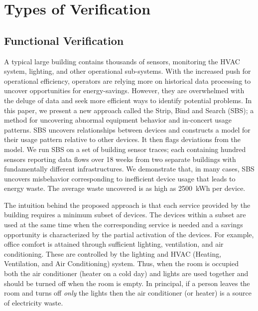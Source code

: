 \section{Types of Verification}


\subsection{Functional Verification}%
A typical large building contains thousands of sensors, monitoring the HVAC system, lighting, and other operational sub-systems.
With the increased push for operational efficiency, operators are relying more on historical data processing to uncover opportunities for energy-savings.
However, they are overwhelmed with the deluge of data and seek more efficient ways to identify potential problems.
In this paper, we present a new approach called the Strip, Bind and Search (SBS); a method for uncovering abnormal 
equipment behavior and in-concert usage patterns.
SBS uncovers relationships between devices and constructs a model for their usage pattern relative to other devices.
It then flags deviations from the model. 
We run SBS on a set of building sensor traces; each containing hundred sensors reporting data flows over 18 weeks from two separate buildings with fundamentally different infrastructures.  
We demonstrate that, in many cases, SBS uncovers misbehavior corresponding to inefficient device usage that leads to energy waste.  
The average waste uncovered is as high as 2500~kWh per device. 

The intuition behind the proposed approach is that each service provided by the building requires a minimum subset of devices.
The devices within a subset are used at the same time when the corresponding service is needed and a savings opportunity is characterized by the partial activation of the devices.
For example, office comfort is attained through sufficient lighting, ventilation, and air conditioning.
These are controlled by the lighting and HVAC (Heating, Ventilation, and Air Conditioning) system.
Thus, when the room is occupied both the air conditioner (heater on a cold day) and lights are used together and should be turned off 
when the room is empty.
In principal, if a person leaves the room and turns off \emph{only} the lights then the air conditioner (or heater) is a source of electricity waste.

